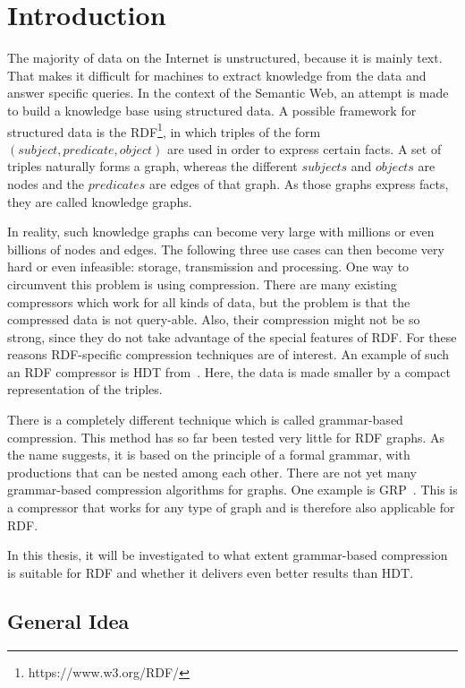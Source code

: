 \chapter{Introduction}\label{ch:introduction}

The majority of data on the Internet is unstructured, because it is mainly text. That makes it difficult for machines to extract knowledge from the data and answer specific queries. In the context of the Semantic Web, an attempt is made to build a knowledge base using structured data. A possible framework for structured data is the \ac{RDF}\footnote{https://www.w3.org/RDF/}, in which triples of the form $ (subject, predicate, object) $ are used in order to express certain facts. A set of triples naturally forms a graph, whereas the different $subjects$ and $objects$ are nodes and the $predicates$ are edges of that graph. As those graphs express facts, they are called knowledge graphs.

In reality, such knowledge graphs can become very large with millions or even billions of nodes and edges. The following three use cases can then become very hard or even infeasible: storage, transmission and processing. One way to circumvent this problem is using compression. There are many existing compressors which work for all kinds of data, but the problem is that the compressed data is not query-able. Also, their compression might not be so strong, since they do not take advantage of the special features of RDF. For these reasons RDF-specific compression techniques are of interest. An example of such an RDF compressor is \ac{HDT} from~\cite{hdt}. Here, the data is made smaller by a compact representation of the triples. 

There is a completely different technique which is called grammar-based compression. This method has so far been tested very little for RDF graphs. As the name suggests, it is based on the principle of a formal grammar, with productions that can be nested among each other. There are not yet many grammar-based compression algorithms for graphs. One example is \ac{GRP}~\cite{maneth}. This is a compressor that works for any type of graph and is therefore also applicable for RDF.

In this thesis, it will be investigated to what extent grammar-based compression is suitable for RDF and whether it delivers even better results than HDT.

\clearpage
\section{General Idea}

